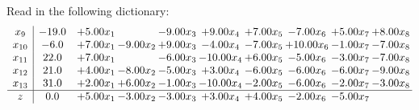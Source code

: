 \documentclass[9pt]{article}
\begin{document}
Read in the following dictionary:
\[\begin{array}{c| c c@{\hskip 2pt} c@{\hskip 2pt} c@{\hskip 2pt} c@{\hskip 2pt} c@{\hskip 2pt} c@{\hskip 2pt} c@{\hskip 2pt} c@{\hskip 2pt} }
 x_{9}   &  -19.0 & +  5.00 x_{1} &   & -9.00 x_{3} & +  9.00 x_{4} & +  7.00 x_{5} & -7.00 x_{6} & +  5.00 x_{7} & +  8.00 x_{8}\\
 x_{10}   &  -6.0 & +  7.00 x_{1} & -9.00 x_{2} & +  9.00 x_{3} & -4.00 x_{4} & -7.00 x_{5} & + 10.00 x_{6} & -1.00 x_{7} & -7.00 x_{8}\\
 x_{11}   &  22.0 & +  7.00 x_{1} &   & -6.00 x_{3} & -10.00 x_{4} & +  6.00 x_{5} & -5.00 x_{6} & -3.00 x_{7} & -7.00 x_{8}\\
 x_{12}   &  21.0 & +  4.00 x_{1} & -8.00 x_{2} & -5.00 x_{3} & +  3.00 x_{4} & -6.00 x_{5} & -6.00 x_{6} & -6.00 x_{7} & -9.00 x_{8}\\
 x_{13}   &  31.0 & +  2.00 x_{1} & +  6.00 x_{2} & -1.00 x_{3} & -10.00 x_{4} & -2.00 x_{5} & -6.00 x_{6} & -2.00 x_{7} & -3.00 x_{8}\\
\hline
z    &  0.0 & +  5.00 x_{1} & -3.00 x_{2} & -3.00 x_{3} & +  3.00 x_{4} & +  4.00 x_{5} & -2.00 x_{6} & -5.00 x_{7} &   \\
\end{array}\]
\end{document}
